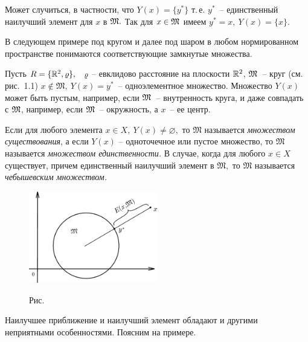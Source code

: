 Может случиться, в частности, что {$Y(x)=\{y^*\}$} т.\,е. $y^*$~-- единственный
наилучший элемент для $x$ в $\mathfrak{M}.$ Так для $x \in \mathfrak{M}$ имеем $y^*=x,\ Y(x)=\{x\}.$

В следующем примере под кругом и далее под шаром в
любом нормированном пространстве понимаются соответствующие
замкнутые множества.

\begin{Example}
{Пусть $R=\{\mathbb{R}^2, \varrho\},$~ $\varrho$ -- евклидово расстояние на плоскости
$\mathbb{R}^2$,} $\mathfrak{M}$~-- круг {{(см. рис.~1.1)}} $x\notin \mathfrak{M},\
Y(x)=y^*$~-- одноэлементное множество. {Множество $Y(x)$} может быть пустым, например, если $\mathfrak{M}$~-- внутренность круга, {и даже совпадать с $\mathfrak{M}$, например, если
$\mathfrak{M}$~-- окружность}, а ${x}$~-- ее центр.
\end{Example}

\begin{defi}
Если для любого элемента $x\in X,\ Y(x)\ne \varnothing,$ то
$\mathfrak{M}$ называется {\it множеством существования}, а
если $Y(x)$ -- одноточечное или пустое множество, то $\mathfrak{M}$
называется {\it множеством единственности.} В случае, когда
для любого $x\in X$ существует, причем единственный наилучший элемент в
$\mathfrak{M},$ то $\mathfrak{M}$ называется {\it чебышевским множеством.}
\end{defi}


\begin{figure}[ht]
\begin{center}
\includegraphics[width=0.5\textwidth]{pict/pict01-1.eps}
\end{center}
 \bigskip
 \label{r1-1}

 \centerline{Рис.~\theris}
 \bigskip
\end{figure}



Наилучшее приближение и наилучший элемент обладают и другими
неприятными особенностями. Поясним на
примере.

